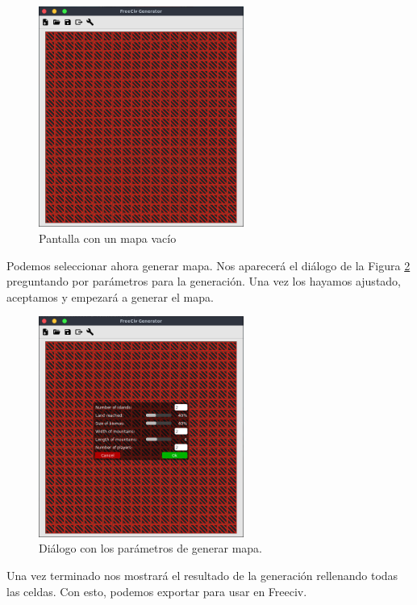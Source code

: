 \begin{figure}[!h]
	\centering
	\includegraphics[width=0.6\textwidth]{images/map.png}
	\caption{Pantalla con un mapa vacío}
	\label{fig:newmapscreen}
\end{figure}

Podemos seleccionar ahora generar mapa. Nos aparecerá el diálogo de la Figura \ref{fig:generatemap} preguntando por parámetros para la generación. Una vez los hayamos ajustado, aceptamos y empezará a generar el mapa. \\

\begin{figure}[!h]
	\centering
	\includegraphics[width=0.6\textwidth]{images/generate-map.png}
	\caption{Diálogo con los parámetros de generar mapa.}
	\label{fig:generatemap}
\end{figure}

Una vez terminado nos mostrará el resultado de la generación rellenando todas las celdas. Con esto, podemos exportar para usar en Freeciv. \\

